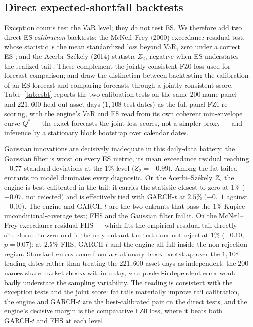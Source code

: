 \documentclass[11pt]{article}
\theoremstyle{remark}
\begin{document}
\subsection{Direct expected-shortfall backtests}
\label{sec:esbt}
Exception counts test the VaR level; they do not test ES. We therefore add two
direct ES \emph{calibration} backtests: the McNeil--Frey (2000)
exceedance-residual test, whose statistic is the mean standardized loss beyond
VaR, zero under a correct ES \citep{mcneilfrey2000}; and the Acerbi--Sz\'ekely
(2014) statistic $Z_2$, negative when ES understates the realized tail
\citep{acerbi2014backtesting}. These complement the jointly consistent FZ0 loss
used for forecast comparison; \citet{noldeziegel2017elicitability} and
\citet{bayer2022esr} draw the distinction between backtesting the calibration of
an ES forecast and comparing forecasts through a jointly consistent score.
Table~\ref{tab:esbt} reports the two calibration tests on the same $200$-name
panel and $221{,}600$ held-out asset-days ($1{,}108$ test dates) as the
full-panel FZ0 re-scoring, with the engine's VaR and ES read from its own
coherent min-envelope curve $Q^{*}$ --- the exact forecasts the joint loss
scores, not a simpler proxy --- and inference by a stationary block bootstrap
over calendar dates.

Gaussian innovations are decisively inadequate in this daily-data battery: the
Gaussian filter is worst on every ES metric, its mean exceedance residual
reaching $-0.77$ standard deviations at the $1\%$ level ($Z_2=-0.99$). Among the
fat-tailed entrants no model dominates every diagnostic. On the Acerbi--Sz\'ekely
$Z_2$ the engine is best calibrated in the tail: it carries the statistic closest
to zero at $1\%$ ($-0.07$, not rejected) and is effectively tied with GARCH-$t$
at $2.5\%$ ($-0.11$ against $-0.10$). The engine and GARCH-$t$ are the two
entrants that pass the $1\%$ Kupiec unconditional-coverage test; FHS and the
Gaussian filter fail it. On the McNeil--Frey exceedance residual FHS --- which
fits the empirical residual tail directly --- sits closest to zero and is the
only entrant the test does not reject at $1\%$ ($-0.10$, $p=0.07$); at $2.5\%$
FHS, GARCH-$t$ and the engine all fall inside the non-rejection region. Standard
errors come from a stationary block bootstrap over the $1{,}108$ trading dates
rather than treating the $221{,}600$ asset-days as independent: the $200$ names
share market shocks within a day, so a pooled-independent error would badly
understate the sampling variability. The reading is consistent with the exception
tests and the joint score: fat tails materially improve tail calibration, the
engine and GARCH-$t$ are the best-calibrated pair on the direct tests, and the
engine's decisive margin is the comparative FZ0 loss, where it beats both
GARCH-$t$ and FHS at each level.
\end{document}
